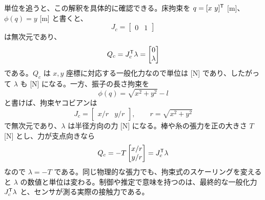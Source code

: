 単位を追うと、この解釈を具体的に確認できる。床拘束を $q=[x\ y]^{\mathsf{T}}$ [m]、$\phi(q)=y$ [m] と書くと、
\begin{equation}
  J_c=\begin{bmatrix}0&1\end{bmatrix}
\end{equation}
は無次元であり、
\begin{equation}
  Q_c=J_c^{\mathsf{T}}\lambda=
  \begin{bmatrix}0\\ \lambda\end{bmatrix}
\end{equation}
である。$Q_c$ は $x,y$ 座標に対応する一般化力なので単位は [N] であり、したがって $\lambda$ も [N] になる。一方、振子の長さ拘束を
\begin{equation}
  \phi(q)=\sqrt{x^2+y^2}-l
\end{equation}
と書けば、拘束ヤコビアンは
\begin{equation}
  J_c=
  \begin{bmatrix}
    x/r&y/r
  \end{bmatrix},
  \qquad r=\sqrt{x^2+y^2}
\end{equation}
で無次元であり、$\lambda$ は半径方向の力 [N] になる。棒や糸の張力を正の大きさ $T$ [N] とし、力が支点向きなら
\begin{equation}
  Q_c=-T
  \begin{bmatrix}
    x/r\\y/r
  \end{bmatrix}
  =
  J_c^{\mathsf{T}}\lambda
\end{equation}
なので $\lambda=-T$ である。同じ物理的な張力でも、拘束式のスケーリングを変えると $\lambda$ の数値と単位は変わる。制御や推定で意味を持つのは、最終的な一般化力 $J_c^{\mathsf{T}}\lambda$ と、センサが測る実際の接触力である。

